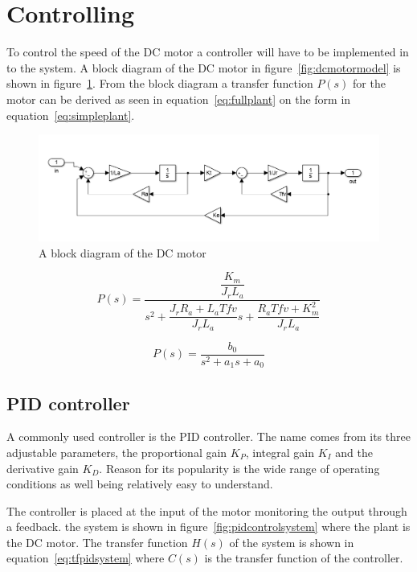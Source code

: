 \section{Controlling}

To control the speed of the DC motor a controller will have to be implemented in to the system. A block diagram of the DC motor in figure~\ref{fig:dcmotormodel} is shown in figure~\ref{fig:dcblock}. From the block diagram a transfer function $P(s)$ for the motor can be derived as seen in equation~\ref{eq:fullplant} on the form in equation~\ref{eq:simpleplant}.

\begin{figure}[!h]
	\centering
	\includegraphics[width=.75\linewidth]{graphics/dcblockdiagram}
	\caption{A block diagram of the DC motor}
	\label{fig:dcblock}
\end{figure}


\begin{equation}
\label{eq:fullplant}
P(s) = \dfrac{\dfrac{K_m}{J_r L_a}}{s^2 + \dfrac{J_r R_a + L_a Tfv}{J_r L_a}s + \dfrac{R_a Tfv +K_m^2}{J_r L_a}}
\end{equation}

\begin{equation}
\label{eq:simpleplant}
P(s) = \dfrac{b_0}{s^2 + a_1 s + a_0}
\end{equation}


\subsection{PID controller}
 A commonly used controller is the PID controller\cite{feedback}. The name comes from its three adjustable parameters, the proportional gain $K_{P}$, integral gain $K_{I}$ and the derivative gain $K_{D}$. Reason for its popularity is the wide range of operating conditions as well being relatively easy to understand. 
 
 The controller is placed at the input of the motor monitoring the output through a feedback. the system is shown in figure~\ref{fig:pidcontrolsystem} where the plant is the DC motor. The transfer function $H(s)$ of the system is shown in equation~\ref{eq:tfpidsystem} where $C(s)$ is the transfer function of the controller.

